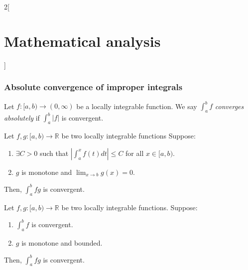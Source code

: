 \documentclass[class=article,crop=false]{standalone}
\begin{document}
\begin{multicols}{2}[\section{Mathematical analysis}]
\subsubsection*{Absolute convergence of improper integrals}
\begin{definition}
Let $f:[a,b)\rightarrow(0,\infty)$ be a locally integrable function. We say $\displaystyle\int_a^b f$ \textit{converges absolutely} if  $\displaystyle\int_a^b |f|$ is convergent.
\end{definition}
\begin{theorem}
Let $f,g:[a,b)\rightarrow\mathbb{R}$ be two locally integrable functions Suppose:
\begin{enumerate}
    \item $\displaystyle\exists C>0$ such that $\left|\int_a^xf(t)dt\right|\leq C$ for all $x\in[a,b)$.
    \item $g$ is monotone and $\displaystyle\lim_{x\to b}g(x)=0$.
\end{enumerate}
Then, $\displaystyle\int_a^b fg$ is convergent.
\end{theorem}
\begin{theorem}
Let $f,g:[a,b)\rightarrow\mathbb{R}$ be two locally integrable functions. Suppose:
\begin{enumerate}
    \item $\displaystyle\int_a^b f$ is convergent.
    \item $g$ is monotone and bounded.
\end{enumerate}
Then, $\displaystyle\int_a^b fg$ is convergent.
\end{theorem}

\end{multicols}
\end{document}
